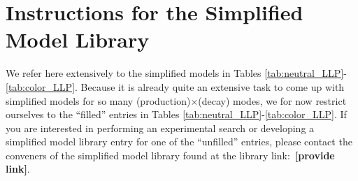 
\section{Instructions for the Simplified Model Library}

We refer here extensively to the simplified models in Tables  \ref{tab:neutral_LLP}-\ref{tab:color_LLP}. Because it is already quite an extensive task to come up with simplified models for so many (production)$\times$(decay) modes, we for now restrict ourselves to the ``filled'' entries in Tables  \ref{tab:neutral_LLP}-\ref{tab:color_LLP}. If you are interested in performing an experimental search or developing a simplified model library entry for one of the ``unfilled'' entries, please contact the conveners of the simplified model library found at the library link:~{\bf [provide link]}.

